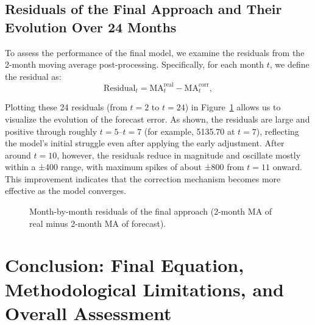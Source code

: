 \documentclass{article}
\begin{document}
\subsection{Residuals of the Final Approach and Their Evolution Over 24 Months}
To assess the performance of the final model, we examine the residuals from the 2-month moving average post-processing. Specifically, for each month \(t\), we define the residual as:
\[
\text{Residual}_t = \text{MA}_t^{\mathrm{real}} - \text{MA}_t^{\mathrm{corr}},
\]

Plotting these 24 residuals (from \(t=2\) to \(t=24\)) in Figure~\ref{fig:residuals_24final} allows us to visualize the evolution of the forecast error. As shown, the residuals are large and positive through roughly \(t=5\)–\(t=7\) (for example, 5135.70 at \(t=7\)), reflecting the model’s initial struggle even after applying the early adjustment. After around \(t=10\), however, the residuals reduce in magnitude and oscillate mostly within a ±400 range, with maximum spikes of about ±800 from \(t=11\) onward. This improvement indicates that the correction mechanism becomes more effective as the model converges.

\begin{figure}[H]
\centering
{}
\caption{Month-by-month residuals of the final approach (2-month MA of real minus 2-month MA of forecast).}
\label{fig:residuals_24final}
\end{figure}

\vspace{2mm}
\section{Conclusion: Final Equation, Methodological Limitations, and Overall Assessment}
\label{sec:final_conclusion}
\end{document}
